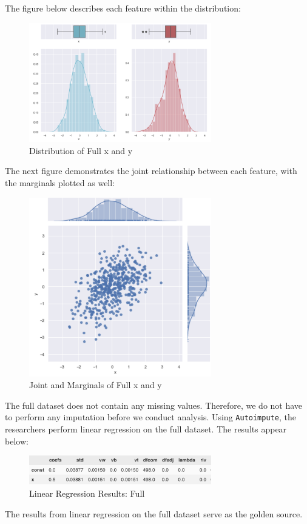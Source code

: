 \documentclass[12pt,oneside]{chicagocapstone}
\begin{document}
The figure below describes each feature within the distribution:
\begin{figure}

{\centering \includegraphics[width=300px]{figure/full-side-by-side} 

}

\caption{Distribution of Full x and y}\label{fig:fullsidebyside}
\end{figure}
The next figure demonstrates the joint relationship between each
feature, with the marginals plotted as well:
\begin{figure}

{\centering \includegraphics[width=300px]{figure/full-joint} 

}

\caption{Joint and Marginals of Full x and y}\label{fig:full-joint}
\end{figure}
The full dataset does not contain any missing values. Therefore, we do
not have to perform any imputation before we conduct analysis. Using
\texttt{Autoimpute}, the researchers perform linear regression on the
full dataset. The results appear below:
\begin{figure}

{\centering \includegraphics[width=300px]{figure/full-regression} 

}

\caption{Linear Regression Results: Full}\label{fig:full-regression}
\end{figure}
The results from linear regression on the full dataset serve as the
golden source.
\end{document}
